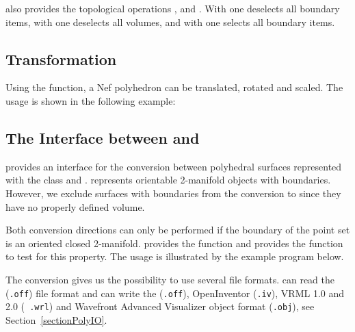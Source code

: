  also provides the topological operations
,  and . With
 one deselects all boundary items, with
 one deselects all volumes, and with 
one selects all boundary items.


\subsection{Transformation}

Using the  function, a Nef polyhedron can be translated, 
rotated and scaled. The usage is shown in the following example:


\subsection{The Interface between \protect{} and 
    \protect{}}
\label{subsectionNef_3Polyhedron}

 provides an interface for the conversion between
polyhedral surfaces represented with the  class
and .   represents orientable
2-manifold objects with boundaries. However, we exclude surfaces with
boundaries from the conversion to  since they
have no properly defined volume.

Both conversion directions can only be performed if the boundary of
the point set is an oriented closed 2-manifold.
 provides the function  and
 provides the function  to test for
this property. The usage is illustrated by the example program below.

The conversion gives us the possibility to use several file formats.
 can read the ({\tt .off}) file format and can write
the ({\tt .off}), OpenInventor ({\tt .iv}), VRML 1.0 and 2.0 ({\tt
  .wrl}) and Wavefront Advanced Visualizer object format ({\tt .obj}),
see Section~\ref{sectionPolyIO}.


